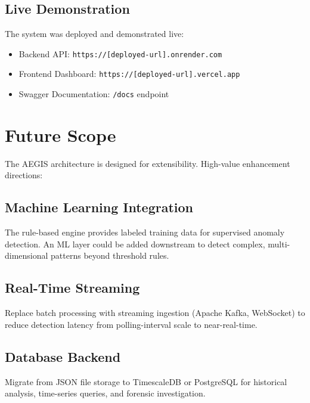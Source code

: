 \documentclass[12pt,a4paper]{article}
\begin{document}
\subsection{Live Demonstration}

The system was deployed and demonstrated live:

\begin{itemize}[noitemsep]
    \item Backend API: \texttt{https://[deployed-url].onrender.com}
    \item Frontend Dashboard: \texttt{https://[deployed-url].vercel.app}
    \item Swagger Documentation: \texttt{/docs} endpoint
\end{itemize}

\section{Future Scope}

The AEGIS architecture is designed for extensibility. High-value enhancement directions:

\subsection{Machine Learning Integration}

The rule-based engine provides labeled training data for supervised anomaly detection. An ML layer could be added downstream to detect complex, multi-dimensional patterns beyond threshold rules.

\subsection{Real-Time Streaming}

Replace batch processing with streaming ingestion (Apache Kafka, WebSocket) to reduce detection latency from polling-interval scale to near-real-time.

\subsection{Database Backend}

Migrate from JSON file storage to TimescaleDB or PostgreSQL for historical analysis, time-series queries, and forensic investigation.
\end{document}
